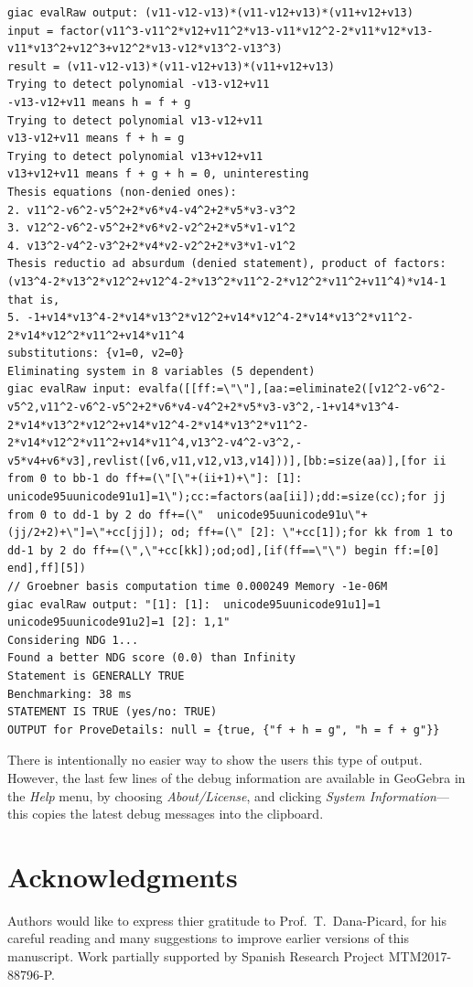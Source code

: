 \documentclass{article}
\begin{document}
{\begin{lstlisting}[language=mylog]
giac evalRaw output: (v11-v12-v13)*(v11-v12+v13)*(v11+v12+v13)
input = factor(v11^3-v11^2*v12+v11^2*v13-v11*v12^2-2*v11*v12*v13-v11*v13^2+v12^3+v12^2*v13-v12*v13^2-v13^3)
result = (v11-v12-v13)*(v11-v12+v13)*(v11+v12+v13)
Trying to detect polynomial -v13-v12+v11
-v13-v12+v11 means h = f + g
Trying to detect polynomial v13-v12+v11
v13-v12+v11 means f + h = g
Trying to detect polynomial v13+v12+v11
v13+v12+v11 means f + g + h = 0, uninteresting
Thesis equations (non-denied ones):
2. v11^2-v6^2-v5^2+2*v6*v4-v4^2+2*v5*v3-v3^2
3. v12^2-v6^2-v5^2+2*v6*v2-v2^2+2*v5*v1-v1^2
4. v13^2-v4^2-v3^2+2*v4*v2-v2^2+2*v3*v1-v1^2
Thesis reductio ad absurdum (denied statement), product of factors:
(v13^4-2*v13^2*v12^2+v12^4-2*v13^2*v11^2-2*v12^2*v11^2+v11^4)*v14-1
that is,
5. -1+v14*v13^4-2*v14*v13^2*v12^2+v14*v12^4-2*v14*v13^2*v11^2-2*v14*v12^2*v11^2+v14*v11^4
substitutions: {v1=0, v2=0}
Eliminating system in 8 variables (5 dependent)
giac evalRaw input: evalfa([[ff:=\"\"],[aa:=eliminate2([v12^2-v6^2-v5^2,v11^2-v6^2-v5^2+2*v6*v4-v4^2+2*v5*v3-v3^2,-1+v14*v13^4-2*v14*v13^2*v12^2+v14*v12^4-2*v14*v13^2*v11^2-2*v14*v12^2*v11^2+v14*v11^4,v13^2-v4^2-v3^2,-v5*v4+v6*v3],revlist([v6,v11,v12,v13,v14]))],[bb:=size(aa)],[for ii from 0 to bb-1 do ff+=(\"[\"+(ii+1)+\"]: [1]:  unicode95uunicode91u1]=1\");cc:=factors(aa[ii]);dd:=size(cc);for jj from 0 to dd-1 by 2 do ff+=(\"  unicode95uunicode91u\"+(jj/2+2)+\"]=\"+cc[jj]); od; ff+=(\" [2]: \"+cc[1]);for kk from 1 to dd-1 by 2 do ff+=(\",\"+cc[kk]);od;od],[if(ff==\"\") begin ff:=[0] end],ff][5])
// Groebner basis computation time 0.000249 Memory -1e-06M
giac evalRaw output: "[1]: [1]:  unicode95uunicode91u1]=1  unicode95uunicode91u2]=1 [2]: 1,1"
Considering NDG 1...
Found a better NDG score (0.0) than Infinity
Statement is GENERALLY TRUE
Benchmarking: 38 ms
STATEMENT IS TRUE (yes/no: TRUE)
OUTPUT for ProveDetails: null = {true, {"f + h = g", "h = f + g"}}
\end{lstlisting}
} %
There is intentionally no easier way to show the users this type of output. However, the last few lines of the debug information are available in GeoGebra in the \textit{Help} menu, by choosing \textit{About/License}, and clicking \textit{System Information}---this copies the latest debug messages into the clipboard.

\section*{Acknowledgments}

Authors would like to express thier gratitude to Prof.~T.~Dana-Picard,
for his careful reading and many suggestions to improve earlier versions
of this manuscript.  Work partially supported by Spanish Research
Project MTM2017-88796-P. 
\end{document}
